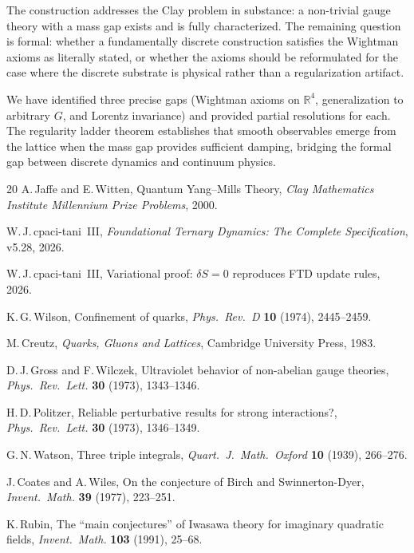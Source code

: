 \documentclass[11pt]{article}
\theoremstyle{tight}
\theoremstyle{plainroman}
\newcommand{\R}{\mathbb{R}}
\begin{document}
The construction addresses the Clay problem in substance: a non-trivial gauge theory with a mass gap exists and is fully characterized.
The remaining question is formal: whether a fundamentally discrete construction satisfies the Wightman axioms as literally stated, or whether the axioms should be reformulated for the case where the discrete substrate is physical rather than a regularization artifact.

We have identified three precise gaps (Wightman axioms on $\R^4$, generalization to arbitrary $G$, and Lorentz invariance) and provided partial resolutions for each.
The regularity ladder theorem establishes that smooth observables emerge from the lattice when the mass gap provides sufficient damping, bridging the formal gap between discrete dynamics and continuum physics.

\begin{thebibliography}{20}
A.\,Jaffe and E.\,Witten,
Quantum Yang--Mills Theory,
\emph{Clay Mathematics Institute Millennium Prize Problems}, 2000.

W.\,J.\,cpaci-tani~III,
\emph{Foundational Ternary Dynamics: The Complete Specification}, v5.28, 2026.

W.\,J.\,cpaci-tani~III,
Variational proof: $\delta S=0$ reproduces FTD update rules, 2026.

K.\,G.\,Wilson,
Confinement of quarks,
\emph{Phys.\ Rev.\ D} \textbf{10} (1974), 2445--2459.

M.\,Creutz,
\emph{Quarks, Gluons and Lattices},
Cambridge University Press, 1983.

D.\,J.\,Gross and F.\,Wilczek,
Ultraviolet behavior of non-abelian gauge theories,
\emph{Phys.\ Rev.\ Lett.} \textbf{30} (1973), 1343--1346.

H.\,D.\,Politzer,
Reliable perturbative results for strong interactions?,
\emph{Phys.\ Rev.\ Lett.} \textbf{30} (1973), 1346--1349.

G.\,N.\,Watson,
Three triple integrals,
\emph{Quart.\ J.\ Math.\ Oxford} \textbf{10} (1939), 266--276.

J.\,Coates and A.\,Wiles,
On the conjecture of Birch and Swinnerton-Dyer,
\emph{Invent.\ Math.} \textbf{39} (1977), 223--251.

K.\,Rubin,
The ``main conjectures'' of Iwasawa theory for imaginary quadratic fields,
\emph{Invent.\ Math.} \textbf{103} (1991), 25--68.
\end{thebibliography}
\end{document}

